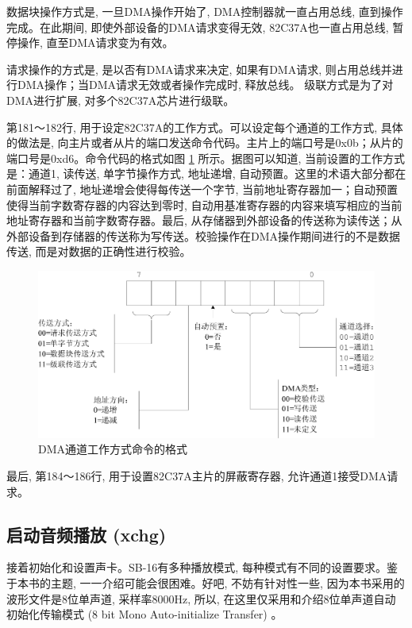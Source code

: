 \documentclass[12pt]{article}
\begin{document}
\begin{CJK}{UTF8}{gbsn}
数据块操作方式是, 一旦DMA操作开始了, DMA控制器就一直占用总线, 直到操作完成。在此期间, 即使外部设备的DMA请求变得无效, 82C37A也一直占用总线, 暂停操作, 直至DMA请求变为有效。

请求操作的方式是, 是以否有DMA请求来决定, 如果有DMA请求, 则占用总线并进行DMA操作；当DMA请求无效或者操作完成时, 释放总线。
级联方式是为了对DMA进行扩展, 对多个82C37A芯片进行级联。

第181～182行, 用于设定82C37A的工作方式。可以设定每个通道的工作方式, 具体的做法是, 向主片或者从片的端口发送命令代码。主片上的端口号是0x0b；从片的端口号是0xd6。命令代码的格式如图 \ref{dma_name} 所示。据图可以知道, 当前设置的工作方式是：通道1, 读传送, 单字节操作方式, 地址递增, 自动预置。这里的术语大部分都在前面解释过了, 地址递增会使得每传送一个字节, 当前地址寄存器加一；自动预置使得当前字数寄存器的内容达到零时, 自动用基准寄存器的内容来填写相应的当前地址寄存器和当前字数寄存器。最后, 从存储器到外部设备的传送称为读传送；从外部设备到存储器的传送称为写传送。校验操作在DMA操作期间进行的不是数据传送, 而是对数据的正确性进行校验。
 
\begin{figure}
\begin{center}
\includegraphics[width=\textwidth]{eps/10-9.bmp.eps}
\caption{DMA通道工作方式命令的格式}\label{dma_name}
\end{center}
\end{figure}

最后, 第184～186行, 用于设置82C37A主片的屏蔽寄存器, 允许通道1接受DMA请求。

\subsection{启动音频播放 (xchg)}

接着初始化和设置声卡。SB-16有多种播放模式, 每种模式有不同的设置要求。鉴于本书的主题, 一一介绍可能会很困难。好吧, 不妨有针对性一些, 因为本书采用的波形文件是8位单声道, 采样率8000Hz, 所以, 在这里仅采用和介绍8位单声道自动初始化传输模式 (8 bit Mono Auto-initialize Transfer) 。


\end{CJK}
\end{document}
